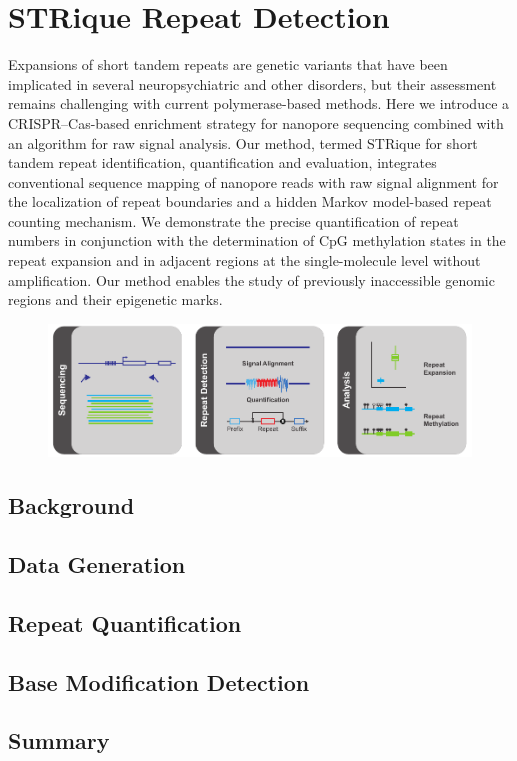 \chapter{STRique Repeat Detection}
\label{sec:strique}

Expansions of short tandem repeats are genetic variants that have been implicated in several neuropsychiatric and other disorders, but their assessment remains challenging with current polymerase-based methods. Here we introduce a CRISPR–Cas-based enrichment strategy for nanopore sequencing combined with an algorithm for raw signal analysis. Our method, termed STRique for short tandem repeat identification, quantification and evaluation, integrates conventional sequence mapping of nanopore reads with raw signal alignment for the localization of repeat boundaries and a hidden Markov model-based repeat counting mechanism. We demonstrate the precise quantification of repeat numbers in conjunction with the determination of CpG methylation states in the repeat expansion and in adjacent regions at the single-molecule level without amplification. Our method enables the study of previously inaccessible genomic regions and their epigenetic marks.

\begin{figure}[h]
    \centering
    \includegraphics[width=1.0\textwidth]{figures/strique/GA.pdf}
    \label{fig:strique:ga}
\end{figure}


\section{Background}
\label{sec:strique:background}

\section{Data Generation}
\label{sec:strique:data}

\section{Repeat Quantification}
\label{sec:strique:quantification}

\section{Base Modification Detection}
\label{sec:strique:modifications}

\section{Summary}
\label{sec:strique:summary}
